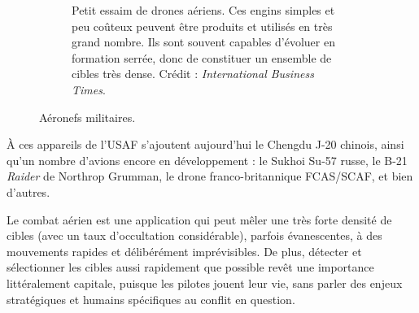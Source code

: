 \begin{figure}[!htbp]
\begin{subfigure}[t]{\subImgAircraftW}
			\caption[Petit essaim de drones aériens]{Petit essaim de drones aériens. Ces engins simples et peu coûteux peuvent être produits et utilisés en très grand nombre. Ils sont souvent capables d'évoluer en formation serrée, donc de constituer un ensemble de cibles très dense. Crédit : \emph{International Business Times}.}
			\label{fig:swarm}
		\end{subfigure}
		\caption{Aéronefs militaires.}
		\label{fig:coolAircraft}
	\end{figure}
	
	À ces appareils de l'USAF s'ajoutent aujourd'hui le Chengdu J-20 chinois, ainsi qu'un nombre d'avions encore en développement : le Sukhoi Su-57 russe, le B-21 \emph{Raider} de Northrop Grumman, le drone franco-britannique FCAS/SCAF, et bien d'autres.
	
	Le combat aérien est une application qui peut mêler une très forte densité de cibles (avec un taux d'occultation considérable), parfois évanescentes, à des mouvements rapides et délibérément imprévisibles. De plus, détecter et sélectionner les cibles aussi rapidement que possible revêt une importance littéralement capitale, puisque les pilotes jouent leur vie, sans parler des enjeux stratégiques et humains spécifiques au conflit en question.
	



